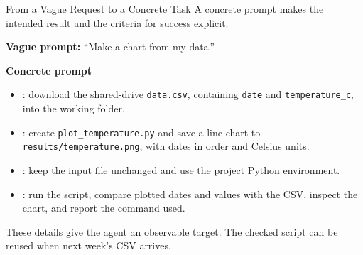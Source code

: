 \ifShowExtendedAIContent
\begin{frame}{From a Vague Request to a Concrete Task}
\small
A concrete prompt makes the intended result and the criteria for success explicit.
\par\smallskip
{}\par
\textbf{Vague prompt:} ``Make a chart from my data.''
\par\medskip
\textbf{Concrete prompt}
\begin{itemize}
\item {}: download the shared-drive \texttt{data.csv}, containing \texttt{date} and \texttt{temperature\_c}, into the working folder.
\item {}: create \texttt{plot\_temperature.py} and save a line chart to \texttt{results/temperature.png}, with dates in order and Celsius units.
\item {}: keep the input file unchanged and use the project Python environment.
\item {}: run the script, compare plotted dates and values with the CSV, inspect the chart, and report the command used.
\end{itemize}
\par\smallskip
These details give the agent an observable target. The checked script can be reused when next week's CSV arrives.
\end{frame}

